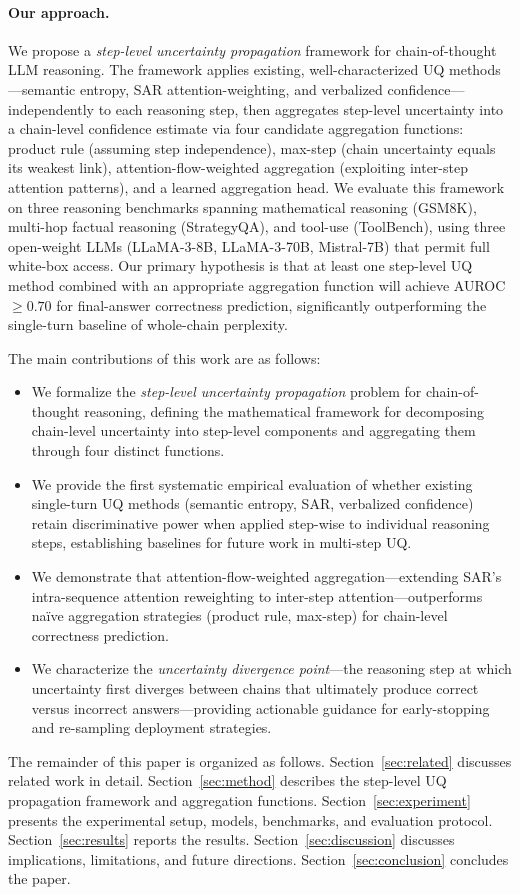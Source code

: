 \paragraph{Our approach.}
We propose a \emph{step-level uncertainty propagation} framework for chain-of-thought LLM reasoning. The framework applies existing, well-characterized UQ methods---semantic entropy, SAR attention-weighting, and verbalized confidence---independently to each reasoning step, then aggregates step-level uncertainty into a chain-level confidence estimate via four candidate aggregation functions: product rule (assuming step independence), max-step (chain uncertainty equals its weakest link), attention-flow-weighted aggregation (exploiting inter-step attention patterns), and a learned aggregation head. We evaluate this framework on three reasoning benchmarks spanning mathematical reasoning (GSM8K), multi-hop factual reasoning (StrategyQA), and tool-use (ToolBench), using three open-weight LLMs (LLaMA-3-8B, LLaMA-3-70B, Mistral-7B) that permit full white-box access. Our primary hypothesis is that at least one step-level UQ method combined with an appropriate aggregation function will achieve AUROC $\geq 0.70$ for final-answer correctness prediction, significantly outperforming the single-turn baseline of whole-chain perplexity.

The main contributions of this work are as follows:
\begin{itemize}
    \item We formalize the \emph{step-level uncertainty propagation} problem for chain-of-thought reasoning, defining the mathematical framework for decomposing chain-level uncertainty into step-level components and aggregating them through four distinct functions.
    \item We provide the first systematic empirical evaluation of whether existing single-turn UQ methods (semantic entropy, SAR, verbalized confidence) retain discriminative power when applied step-wise to individual reasoning steps, establishing baselines for future work in multi-step UQ.
    \item We demonstrate that attention-flow-weighted aggregation---extending SAR's intra-sequence attention reweighting to inter-step attention---outperforms na\"ive aggregation strategies (product rule, max-step) for chain-level correctness prediction.
    \item We characterize the \emph{uncertainty divergence point}---the reasoning step at which uncertainty first diverges between chains that ultimately produce correct versus incorrect answers---providing actionable guidance for early-stopping and re-sampling deployment strategies.
\end{itemize}

The remainder of this paper is organized as follows. Section~\ref{sec:related} discusses related work in detail. Section~\ref{sec:method} describes the step-level UQ propagation framework and aggregation functions. Section~\ref{sec:experiment} presents the experimental setup, models, benchmarks, and evaluation protocol. Section~\ref{sec:results} reports the results. Section~\ref{sec:discussion} discusses implications, limitations, and future directions. Section~\ref{sec:conclusion} concludes the paper.

